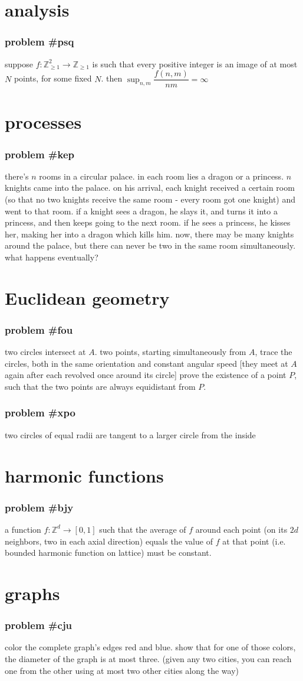 \documentclass{article}
\newcommand{\problem}[1]{\subsubsection*{\textbf{problem \##1}}}
\newcommand{\chapter}[1]{\section*{#1}}
\newcommand{\Z}{\mathbb{Z}}
\newcommand{\Zpv}{\mathbb{Z}_{\ge1}}
\begin{document}
\chapter{analysis}
\problem{psq} suppose $f:\Zpv^2\to\Zpv$ is such that every positive integer is an image of at most $N$ points, for some fixed $N$. then $\displaystyle{\sup_{n,m}} \dfrac{f(n,m)}{nm}=\infty$
\chapter{processes}
\problem{kep} there's $n$ rooms in a circular palace. in each room lies a dragon or a princess. $n$ knights came into the palace. on his arrival, each knight received a certain room (so that no two knights receive the same room - every room got one knight) and went to that room. if a knight sees a dragon, he slays it, and turns it into a princess, and then keeps going to the next room. if he sees a princess, he kisses her, making her into a dragon which kills him. now, there may be many knights around the palace, but there can never be two in the same room simultaneously. what happens eventually?
\chapter{Euclidean geometry}
\problem{fou} two circles intersect at $A$. two points, starting simultaneously from $A$, trace the circles, both in the same orientation and constant angular speed [they meet at $A$ again after each revolved once around its
circle] prove the existence of a point $P$, such that the two points are always equidistant from $P$.
\problem{xpo} two circles of equal radii are tangent to a larger circle from the inside
\chapter{harmonic functions}
\problem{bjy} a function $f:\Z^d\to[0,1]$ such that the average of $f$ around each point (on its $2d$ neighbors, two in each axial direction) equals the value of $f$ at that point (i.e. bounded harmonic function on lattice) must be constant.
\chapter{graphs}
\problem{cju} color the complete graph's edges red and blue. show that for one of those colors, the diameter of the graph is at most three. (given any two cities, you can reach one from the other using at most two other cities along the way)
\end{document}
